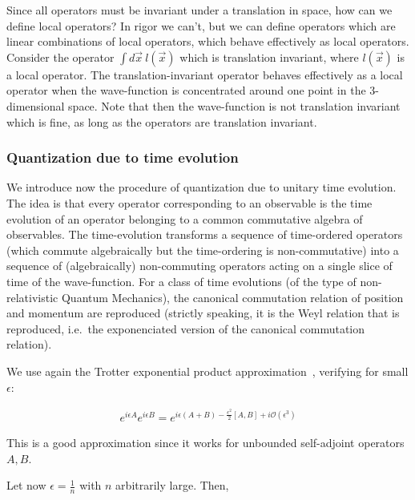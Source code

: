 \documentclass[11pt]{book}
\begin{document}
Since all operators must be invariant under a translation in space, how
can we define local operators? In rigor we can't, but we can define
operators which are linear combinations of local operators, which behave
effectively as local operators. Consider the operator
\(\int d\vec{x}\ l(\vec{x})\) which is translation invariant, where
\(l(\vec{x})\) is a local operator. The translation-invariant operator
behaves effectively as a local operator when the wave-function is
concentrated around one point in the 3-dimensional space. Note that then
the wave-function is not translation invariant which is fine, as long as
the operators are translation invariant.

\hypertarget{quantization-due-to-time-evolution}{%
\subsubsection{Quantization due to time
evolution}\label{quantization-due-to-time-evolution}}

We introduce now the procedure of quantization due to unitary time
evolution. The idea is that every operator corresponding to an
observable is the time evolution of an operator belonging to a common
commutative algebra of observables. The time-evolution transforms a
sequence of time-ordered
operators~\cite{Gill2017feynman} (which
commute algebraically but the time-ordering is non-commutative) into a
sequence of (algebraically) non-commuting operators acting on a single
slice of time of the wave-function. For a class of time evolutions (of
the type of non-relativistic Quantum Mechanics), the canonical
commutation relation of position and momentum are reproduced (strictly
speaking, it is the Weyl relation that is reproduced, i.e.~the
exponenciated version of the canonical commutation relation).

We use again the Trotter exponential product
approximation~\cite{Hatano2005Finding}, verifying for small \(\epsilon\):

\begin{equation}\begin{aligned}
    e^{i\epsilon A}e^{i\epsilon B}=
    e^{i\epsilon (A+B)-\frac{\epsilon^2}{2}[A,B]+i\mathcal{O}(\epsilon^3)}\end{aligned}\end{equation}

This is a good approximation since it works for unbounded self-adjoint
operators \(A,B\).

Let now \(\epsilon=\frac{1}{n}\) with \(n\) arbitrarily large. Then,
\end{document}

